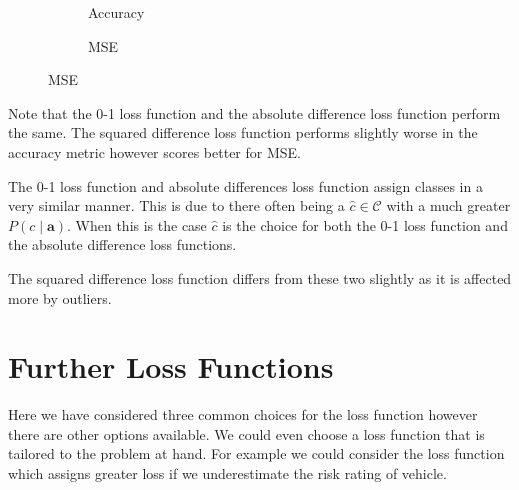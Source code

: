 \begin{figure}
	\centering
	\begin{subfigure}{.5\textwidth}
		\caption{Accuracy}
	\end{subfigure}%
	\begin{subfigure}{.5\textwidth}
		\caption{MSE}
	\end{subfigure}
\end{figure}

Note that the 0-1 loss function and the absolute difference loss function perform the same.
The squared difference loss function performs slightly worse in the accuracy metric however scores better for MSE.

The 0-1 loss function and absolute differences loss function assign classes in a very similar manner.
This is due to there often being a $\hat{c} \in \mathcal{C}$ with a much greater $P(c \mid \mathbf{a})$.
When this is the case $\hat{c}$ is the choice for both the 0-1 loss function and the absolute difference loss functions.

The squared difference loss function differs from these two slightly as it is affected more by outliers.

\section{Further Loss Functions}
Here we have considered three common choices for the loss function however there are other options available.
We could even choose a loss function that is tailored to the problem at hand.
For example we could consider the loss function which assigns greater loss if we underestimate the risk rating of vehicle.